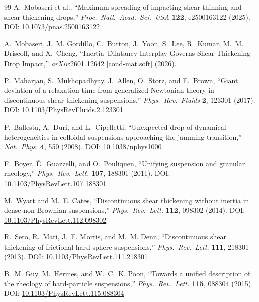 \documentclass[11pt,letterpaper]{article}
\begin{document}
\begin{thebibliography}{99}
  A.~Mobaseri et al.,
  ``Maximum spreading of impacting shear-thinning and shear-thickening drops,''
  \textit{Proc.\ Natl.\ Acad.\ Sci.\ USA} \textbf{122}, e2500163122 (2025).
  DOI: \href{https://doi.org/10.1073/pnas.2500163122}{10.1073/pnas.2500163122}

  A.~Mobaseri, J.~M. Gordillo, C.~Burton, J.~Yoon, S.~Lee, R.~Kumar,
  M.~M. Driscoll, and X.~Cheng,
  ``Inertia--Dilatancy Interplay Governs Shear-Thickening Drop Impact,''
  \textit{arXiv}:2601.12642 [cond-mat.soft] (2026).

  P.~Maharjan, S.~Mukhopadhyay, J.~Allen, O.~Storz, and E.~Brown,
  ``Giant deviation of a relaxation time from generalized Newtonian theory
  in discontinuous shear thickening suspensions,''
  \textit{Phys.\ Rev.\ Fluids} \textbf{2}, 123301 (2017).
  DOI: \href{https://doi.org/10.1103/PhysRevFluids.2.123301}{10.1103/PhysRevFluids.2.123301}

  P.~Ballesta, A.~Duri, and L.~Cipelletti,
  ``Unexpected drop of dynamical heterogeneities in colloidal suspensions
  approaching the jamming transition,''
  \textit{Nat.\ Phys.} \textbf{4}, 550 (2008).
  DOI: \href{https://doi.org/10.1038/nphys1000}{10.1038/nphys1000}

  F.~Boyer, \'{E}.~Guazzelli, and O.~Pouliquen,
  ``Unifying suspension and granular rheology,''
  \textit{Phys.\ Rev.\ Lett.} \textbf{107}, 188301 (2011).
  DOI: \href{https://doi.org/10.1103/PhysRevLett.107.188301}{10.1103/PhysRevLett.107.188301}

  M.~Wyart and M.~E. Cates,
  ``Discontinuous shear thickening without inertia in dense non-Brownian
  suspensions,''
  \textit{Phys.\ Rev.\ Lett.} \textbf{112}, 098302 (2014).
  DOI: \href{https://doi.org/10.1103/PhysRevLett.112.098302}{10.1103/PhysRevLett.112.098302}

  R.~Seto, R.~Mari, J.~F. Morris, and M.~M. Denn,
  ``Discontinuous shear thickening of frictional hard-sphere suspensions,''
  \textit{Phys.\ Rev.\ Lett.} \textbf{111}, 218301 (2013).
  DOI: \href{https://doi.org/10.1103/PhysRevLett.111.218301}{10.1103/PhysRevLett.111.218301}

  B.~M. Guy, M.~Hermes, and W.~C.~K. Poon,
  ``Towards a unified description of the rheology of hard-particle suspensions,''
  \textit{Phys.\ Rev.\ Lett.} \textbf{115}, 088304 (2015).
  DOI: \href{https://doi.org/10.1103/PhysRevLett.115.088304}{10.1103/PhysRevLett.115.088304}


\end{thebibliography}
\end{document}
